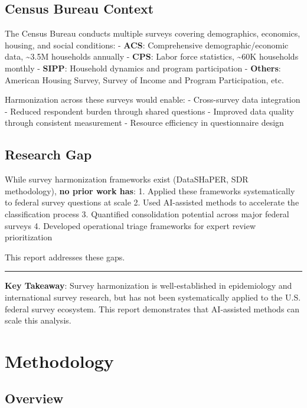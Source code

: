 \documentclass[
  letterpaper,
]{report}
\begin{document}
\section{Census Bureau Context}\label{census-bureau-context}

The Census Bureau conducts multiple surveys covering demographics,
economics, housing, and social conditions: - \textbf{ACS}: Comprehensive
demographic/economic data, \textasciitilde3.5M households annually -
\textbf{CPS}: Labor force statistics, \textasciitilde60K households
monthly - \textbf{SIPP}: Household dynamics and program participation -
\textbf{Others}: American Housing Survey, Survey of Income and Program
Participation, etc.

Harmonization across these surveys would enable: - Cross-survey data
integration - Reduced respondent burden through shared questions -
Improved data quality through consistent measurement - Resource
efficiency in questionnaire design

\section{Research Gap}\label{research-gap}

While survey harmonization frameworks exist (DataSHaPER, SDR
methodology), \textbf{no prior work has}: 1. Applied these frameworks
systematically to federal survey questions at scale 2. Used AI-assisted
methods to accelerate the classification process 3. Quantified
consolidation potential across major federal surveys 4. Developed
operational triage frameworks for expert review prioritization

This report addresses these gaps.

\begin{center}\rule{0.5\linewidth}{0.5pt}\end{center}

\textbf{Key Takeaway}: Survey harmonization is well-established in
epidemiology and international survey research, but has not been
systematically applied to the U.S. federal survey ecosystem. This report
demonstrates that AI-assisted methods can scale this analysis.


\chapter{Methodology}\label{methodology}

\section{Overview}\label{overview}
\end{document}
